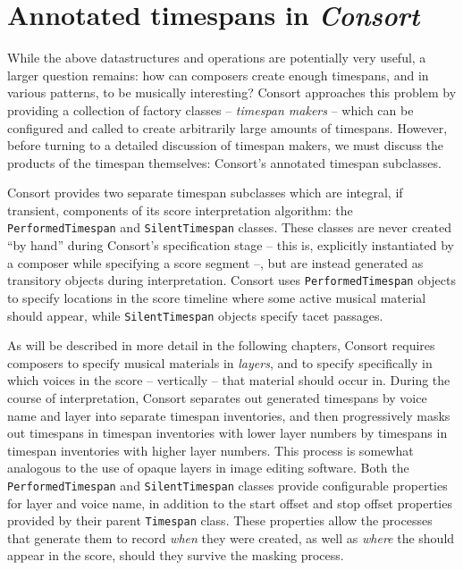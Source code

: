 \section{Annotated timespans in \emph{Consort}}

While the above datastructures and operations are potentially very useful, a
larger question remains: how can composers create enough timespans, and in
various patterns, to be musically interesting? Consort approaches this problem
by providing a collection of factory classes -- \emph{timespan makers} -- which
can be configured and called to create arbitrarily large amounts of timespans.
However, before turning to a detailed discussion of timespan makers, we must
discuss the products of the timespan themselves: Consort's annotated timespan
subclasses.

Consort provides two separate timespan subclasses which are integral, if
transient, components of its score interpretation algorithm: the
\texttt{PerformedTimespan} and \texttt{SilentTimespan} classes. These classes
are never created \enquote{by hand} during Consort's specification stage --
this is, explicitly instantiated by a composer while specifying a score segment
--, but are instead generated as transitory objects during interpretation.
Consort uses \texttt{PerformedTimespan} objects to specify locations in the
score timeline where some active musical material should appear, while
\texttt{SilentTimespan} objects specify tacet passages.

As will be described in more detail in the following chapters, Consort requires
composers to specify musical materials in \emph{layers}, and to specify
specifically in which voices in the score -- vertically -- that material should
occur in. During the course of interpretation, Consort separates out generated
timespans by voice name and layer into separate timespan inventories, and then
progressively masks out timespans in timespan inventories with lower layer
numbers by timespans in timespan inventories with higher layer numbers. This
process is somewhat analogous to the use of opaque layers in image editing
software. Both the \texttt{PerformedTimespan} and \texttt{SilentTimespan}
classes provide configurable properties for layer and voice name, in addition
to the start offset and stop offset properties provided by their parent
\texttt{Timespan} class. These properties allow the processes that generate
them to record \emph{when} they were created, as well as \emph{where} the
should appear in the score, should they survive the masking process.

